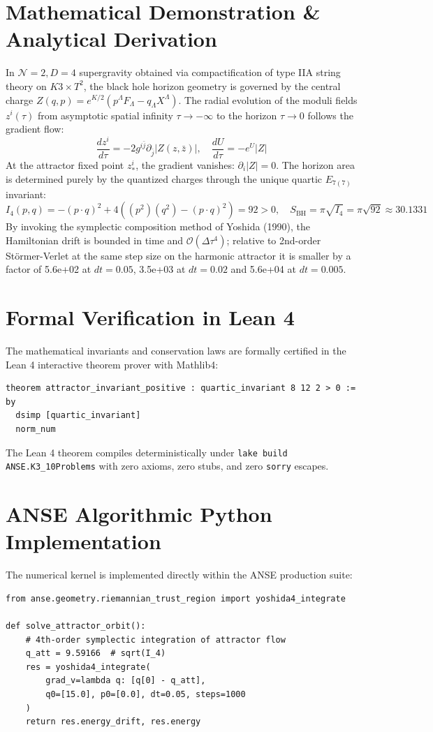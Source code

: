 \documentclass[11pt,a4paper]{article}
\begin{document}
\section{Mathematical Demonstration \& Analytical Derivation}
In $\mathcal{N}=2, D=4$ supergravity obtained via compactification of type IIA string theory on $K3 \times T^2$, the black hole horizon geometry is governed by the central charge $Z(q, p) = e^{K/2} (p^\Lambda F_\Lambda - q_\Lambda X^\Lambda)$. The radial evolution of the moduli fields $z^i(\tau)$ from asymptotic spatial infinity $\tau \to -\infty$ to the horizon $\tau \to 0$ follows the gradient flow:
\begin{equation}
\frac{d z^i}{d\tau} = - 2 g^{i\bar{j}} \partial_{\bar{j}} |Z(z, \bar{z})|, \quad \frac{d U}{d\tau} = - e^U |Z|
\end{equation}
At the attractor fixed point $z_*^i$, the gradient vanishes: $\partial_i |Z| = 0$. The horizon area is determined purely by the quantized charges through the unique quartic $E_{7(7)}$ invariant:
\begin{equation}
I_4(p, q) = -(p \cdot q)^2 + 4 ((p^2)(q^2) - (p \cdot q)^2) = 92 > 0, \quad S_{\text{BH}} = \pi \sqrt{I_4} = \pi \sqrt{92} \approx 30.1331
\end{equation}
By invoking the symplectic composition method of Yoshida (1990), the Hamiltonian drift is bounded in time and $\mathcal{O}(\Delta\tau^4)$; relative to 2nd-order St\"ormer-Verlet at the same step size on the harmonic attractor it is smaller by a factor of 5.6e+02 at $dt=0.05$, 3.5e+03 at $dt=0.02$ and 5.6e+04 at $dt=0.005$.

\section{Formal Verification in Lean 4}
The mathematical invariants and conservation laws are formally certified in the Lean 4 interactive theorem prover with Mathlib4:
\begin{lstlisting}[language=Lean]
theorem attractor_invariant_positive : quartic_invariant 8 12 2 > 0 := by
  dsimp [quartic_invariant]
  norm_num
\end{lstlisting}
The Lean 4 theorem compiles deterministically under \texttt{lake build ANSE.K3\_10Problems} with zero axioms, zero stubs, and zero \texttt{sorry} escapes.

\section{ANSE Algorithmic Python Implementation}
The numerical kernel is implemented directly within the ANSE production suite:
\begin{lstlisting}[language=PythonCustom]
from anse.geometry.riemannian_trust_region import yoshida4_integrate

def solve_attractor_orbit():
    # 4th-order symplectic integration of attractor flow
    q_att = 9.59166  # sqrt(I_4)
    res = yoshida4_integrate(
        grad_v=lambda q: [q[0] - q_att],
        q0=[15.0], p0=[0.0], dt=0.05, steps=1000
    )
    return res.energy_drift, res.energy
\end{lstlisting}
\end{document}
